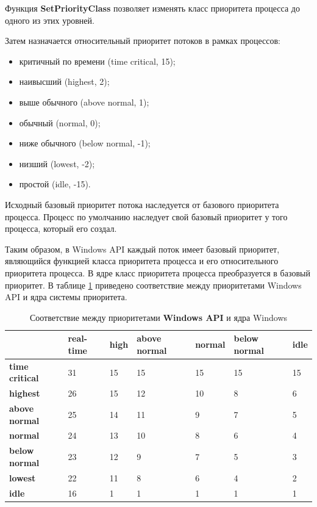 \documentclass[a4paper,14pt]{extarticle}
\begin{document}
Функция \textbf{SetPriorityClass} позволяет изменять класс приоритета процесса до одного
из этих уровней.

Затем назначается относительный приоритет потоков в рамках процессов:
\begin{itemize}
	\item критичный по времени (time critical, 15);
	\item наивысший (highest, 2);
	\item выше обычного (above normal, 1);
	\item обычный (normal, 0);
	\item ниже обычного (below normal, -1); 
	\item низший (lowest, -2); 
	\item простой (idle, -15).
\end{itemize}

Исходный базовый приоритет потока наследуется от базового приоритета процесса. Процесс по умолчанию наследует свой базовый приоритет у того 
процесса, который его создал.

Таким образом, в Windows API каждый поток имеет базовый приоритет, являющийся функцией класса приоритета процесса и его относительного 
приоритета процесса. В ядре класс приоритета процесса преобразуется в базовый приоритет. В таблице \ref{tbl:priority} приведено соответствие 
между приоритетами Windows API и ядра системы приоритета.

\begin{table}[h]
    \caption{Соответствие между приоритетами \textbf{Windows API} и ядра Windows}
    \begin{center}
        \begin{tabular}{|l|p{45pt}|p{45pt}|p{45pt}|p{45pt}|p{45pt}|p{45pt}|}
            \hline
            {} & \textbf{real-time} & \textbf{high} & \textbf{above normal} & \textbf{normal} & \textbf{below normal} & \textbf{idle}\\
            \hline
            \textbf{time critical} & 31 & 15 & 15 & 15 & 15 & 15 \\
            \hline
            \textbf{highest} & 26 & 15 & 12 & 10 & 8 & 6 \\
            \hline
            \textbf{above normal} & 25 & 14 & 11 & 9 & 7 & 5 \\
            \hline
            \textbf{normal} & 24 & 13 & 10 & 8 & 6 & 4 \\
            \hline
            \textbf{below normal} & 23 & 12 & 9 & 7 & 5 & 3 \\
            \hline
            \textbf{lowest} & 22 & 11 & 8 & 6 & 4 & 2 \\
            \hline
            \textbf{idle} & 16 & 1 & 1 & 1 & 1 & 1 \\
            \hline
        \end{tabular}
    \end{center}
    \label{tbl:priority}
\end{table}
\end{document}

